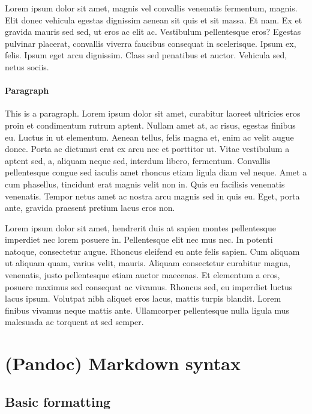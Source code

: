 \documentclass{article}
\begin{document}
Lorem ipsum dolor sit amet, magnis vel convallis venenatis fermentum, magnis. Elit donec vehicula egestas dignissim aenean sit quis et sit massa. Et nam. Ex et gravida mauris sed sed, ut eros ac elit ac. Vestibulum pellentesque eros? Egestas pulvinar placerat, convallis viverra faucibus consequat in scelerisque. Ipsum ex, felis. Ipsum eget arcu dignissim. Class sed penatibus et auctor. Vehicula sed, netus sociis.

\hypertarget{paragraph}{%
\paragraph{Paragraph}\label{paragraph}}

This is a paragraph. Lorem ipsum dolor sit amet, curabitur laoreet ultricies eros proin et condimentum rutrum aptent. Nullam amet at, ac risus, egestas finibus eu. Luctus in ut elementum. Aenean tellus, felis magna et, enim ac velit augue donec. Porta ac dictumst erat ex arcu nec et porttitor ut. Vitae vestibulum a aptent sed, a, aliquam neque sed, interdum libero, fermentum. Convallis pellentesque congue sed iaculis amet rhoncus etiam ligula diam vel neque. Amet a cum phasellus, tincidunt erat magnis velit non in. Quis eu facilisis venenatis venenatis. Tempor netus amet ac nostra arcu magnis sed in quis eu. Eget, porta ante, gravida praesent pretium lacus eros non.

Lorem ipsum dolor sit amet, hendrerit duis at sapien montes pellentesque imperdiet nec lorem posuere in. Pellentesque elit nec mus nec. In potenti natoque, consectetur augue. Rhoncus eleifend eu ante felis sapien. Cum aliquam ut aliquam quam, varius velit, mauris. Aliquam consectetur curabitur magna, venenatis, justo pellentesque etiam auctor maecenas. Et elementum a eros, posuere maximus sed consequat ac vivamus. Rhoncus sed, eu imperdiet luctus lacus ipsum. Volutpat nibh aliquet eros lacus, mattis turpis blandit. Lorem finibus vivamus neque mattis ante. Ullamcorper pellentesque nulla ligula mus malesuada ac torquent at sed semper.

\hypertarget{pandoc}{%
\section{(Pandoc) Markdown syntax}\label{pandoc}}

\hypertarget{basic-formatting}{%
\subsection{Basic formatting}\label{basic-formatting}}
\end{document}

